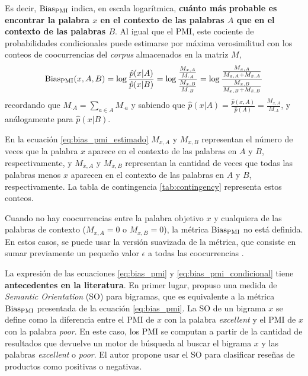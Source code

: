 Es decir, $\operatorname{Bias_{PMI}}$ indica, en escala logarítmica, \textbf{cuánto más probable es encontrar la palabra $x$ en el contexto de las palabras $A$ que en el contexto de las palabras $B$}. Al igual que el PMI, este cociente de probabilidades condicionales puede estimarse por máxima verosimilitud con los conteos de coocurrencias del \emph{corpus} almacenados en la matriz $M$, 
%
\begin{equation} \label{eq:bias_pmi_estimado}
    \operatorname{Bias_{PMI}}(x,A,B)
    = \log \frac{\hat{p}(x|A)}{\hat{p}(x|B)}
    = \log \frac{\frac{M_{x,A}}{M_{\cdot A}}}{\frac{M_{x,B}}{M_{\cdot B}}}
    = \log \frac{
        \frac{M_{x,A}}{M_{x,A} + M_{\bar{x},A}}}{
        \frac{M_{x,B}}{M_{x,B} + M_{\bar{x},B}}}
\end{equation}
%
recordando que $M_{\cdot A} = \sum_{a \in A} M_{\cdot a}$ y sabiendo que $\hat{p}(x|A) = 
\frac{\hat{p}(x,A)}{\hat{p}(A)} = 
\frac{M_{x,A}}{M_{\cdot A}}$, y análogamente para $\hat{p}(x|B)$.


En la ecuación \ref{eq:bias_pmi_estimado} $M_{x,A}$ y $M_{x,B}$ representan el número de veces que la palabra $x$ aparece en el contexto de las palabras en $A$ y $B$, respectivamente, y $M_{\bar{x},A}$ y $M_{\bar{x},B}$ representan la cantidad de veces que todas las palabras menos $x$ aparecen en el contexto de las palabras en $A$ y $B$, respectivamente. La tabla de contingencia \ref{tab:contingency} representa estos conteos.



Cuando no hay coocurrencias entre la palabra objetivo $x$ y cualquiera de las palabras de contexto ($M_{x,A}=0$ o $M_{x,B}=0$), la métrica $\operatorname{Bias_{PMI}}$ no está definida. En estos casos, se puede usar la versión suavizada de la métrica, que consiste en sumar previamente un pequeño valor $\epsilon$ a todas las coocurrencias \citep{jurafsky2000speech}. 

La expresión de las ecuaciones \ref{eq:bias_pmi} y \ref{eq:bias_pmi_condicional} tiene \textbf{antecedentes en la literatura}. En primer lugar, \citet{turney2002thumbs} propuso una medida de \emph{Semantic Orientation} (SO) para bigramas, que es equivalente a la métrica $\operatorname{Bias_{PMI}}$ presentada de la ecuación \ref{eq:bias_pmi}. La SO de un bigrama $x$ se define como la diferencia entre el PMI de $x$ con la palabra \emph{excellent} y el PMI de $x$ con la palabra \emph{poor}. En este caso, los PMI se computan a partir de la cantidad de resultados que devuelve un motor de búsqueda al buscar el bigrama $x$ y las palabras \emph{excellent} o \emph{poor}. El autor propone usar el SO para clasificar reseñas de productos como positivas o negativas. 

